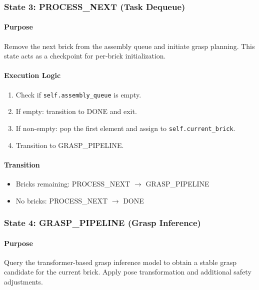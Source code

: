 \subsubsection{State 3: PROCESS\_NEXT (Task Dequeue)}
\label{state:processnext}

\paragraph{Purpose}

Remove the next brick from the assembly queue and initiate grasp planning. This state acts as a checkpoint for per-brick initialization.

\paragraph{Execution Logic}

\begin{enumerate}
    \item Check if \texttt{self.assembly\_queue} is empty.
    \item If empty: transition to DONE and exit.
    \item If non-empty: pop the first element and assign to \texttt{self.current\_brick}.
    \item Transition to GRASP\_PIPELINE.
\end{enumerate}

\paragraph{Transition}

\begin{itemize}
    \item Bricks remaining: PROCESS\_NEXT $\rightarrow$ GRASP\_PIPELINE
    \item No bricks: PROCESS\_NEXT $\rightarrow$ DONE
\end{itemize}

\subsubsection{State 4: GRASP\_PIPELINE (Grasp Inference)}
\label{state:grasppipeline}

\paragraph{Purpose}

Query the transformer-based grasp inference model to obtain a stable grasp candidate for the current brick. Apply pose transformation and additional safety adjustments.

